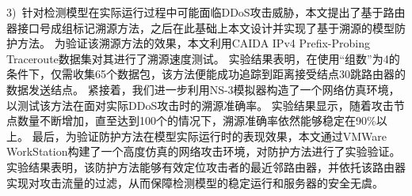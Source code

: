 \begin{cabstract}
3)~针对检测模型在实际运行过程中可能面临DDoS攻击威胁，本文提出了基于路由器接口号成组标记溯源方法，之后在此基础上本文设计并实现了基于溯源的模型防护方法。
为验证该溯源方法的效果，本文利用CAIDA IPv4 Prefix-Probing Traceroute数据集对其进行了溯源速度测试。
实验结果表明，在使用“组数”为4的条件下，仅需收集65个数据包，该方法便能成功追踪到距离接受结点30跳路由器的数据发送结点。
紧接着，我们进一步利用NS-3模拟器构造了一个网络仿真环境，以测试该方法在面对实际DDoS攻击时的溯源准确率。
实验结果显示，随着攻击节点数量不断增加，直至达到100个的情况下，溯源准确率依然能够稳定在90\%以上。
最后，为验证防护方法在模型实际运行时的表现效果，本文通过VMWare WorkStation构建了一个高度仿真的网络攻击环境，对防护方法进行了实验验证。
实验结果表明，该防护方法能够有效定位攻击者的最近邻路由器，并依托该路由器实现对攻击流量的过滤，从而保障检测模型的稳定运行和服务器的安全无虞。
\end{cabstract}


